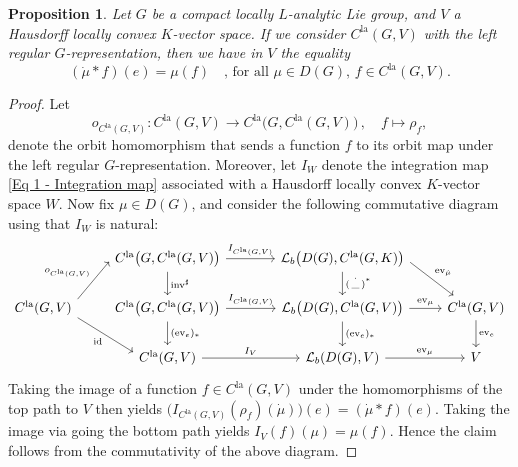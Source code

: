 \documentclass[a4paper, reqno, 10pt]{amsart}
\newtheorem{proposition}[theorem]{Proposition}
\theoremstyle{definition}
\numberwithin{equation}{section}
\newcommand{\blank}{{\,\_\,}}
\newcommand{\id}{{\mathrm{id}}}
\newcommand{\inv}{{\mathrm{inv}}}
\newcommand{\la}{{\mathrm{la}}}
\newcommand{\lra}{\longrightarrow}
\newcommand{\lto}{\longmapsto}
\newcommand{\CL}{{\mathcal {L}}}
\begin{document}
\begin{proposition}\label{Prop 1 - Compatibility of convolution and pairing for left regular representation}
	Let $G$ be a compact locally $L$-analytic Lie group, and $V$ a Hausdorff locally convex $K$-vector space.
	If we consider $C^\la(G,V)$ with the left regular $G$-representation, then we have in $V$ the equality
	\begin{equation*}
		(\dot{\mu} \ast f)(e) = \mu(f) \quad\text{, for all $\mu \in D(G)$, $f \in C^\la(G,V)$.}
	\end{equation*}
\end{proposition}
\begin{proof}
	Let
	\begin{equation*}
		o_{C^\la(G,V)} \colon C^\la(G,V) \lra C^\la \big(G,C^\la(G,V) \big) \,,\quad f \lto \rho_f ,
	\end{equation*}
	denote the orbit homomorphism that sends a function $f$ to its orbit map under the left regular $G$-representation.
	Moreover, let $I_W$ denote the integration map \eqref{Eq 1 - Integration map} associated with a Hausdorff locally convex $K$-vector space $W$.
	Now fix $\mu \in D(G)$, and consider the following commutative diagram using that $I_W$ is natural:
	\begin{equation*}
		\begin{tikzcd}[]
			& C^\la \big(G,C^\la(G,V) \big) \ar[r,"I_{C^\la(G,V)}"] \ar[d, "\inv^\sharp"] &[+13pt] \CL_b \big(D(G),C^\la(G,K) \big) \ar[rd, start anchor=357, end anchor=150, "\mathrm{ev}_{\dot{\mu}}"] \ar[d, "\dot{(\blank)}^\ast"] & \\
			C^\la(G,V) \ar[ru, start anchor= 15, end anchor=183, "o_{C^\la(G,V)}"] \ar[rd, start anchor= 345, end anchor=170, "\id"'] & C^\la\big(G,C^\la(G,V)\big) \ar[r, "I_{C^\la(G,V)}"] \ar[d, "(\mathrm{ev}_e)_\ast"] & \CL_b \big(D(G), C^\la(G,V) \big) \ar[r, "\mathrm{ev}_\mu"] \ar[d, "(\mathrm{ev}_e)_\ast"] & C^\la(G,V) \ar[d, "\mathrm{ev}_e"] \\
			& C^\la(G,V) \ar[r, "I_V"] & \CL_b(D(G),V) \ar[r, "\mathrm{ev}_\mu"] & V
		\end{tikzcd}
	\end{equation*}
	Taking the image of a function $f\in C^\la(G,V)$ under the homomorphisms of the top path to $V$ then yields $ \big( I_{C^\la(G,V)}(\rho_f)(\dot{\mu})\big)(e) = (\dot{\mu}\ast f)(e)$.
	Taking the image via going the bottom path yields $I_V(f)(\mu) = \mu(f)$.
	Hence the claim follows from the commutativity of the above diagram.
\end{proof}
\end{document}
